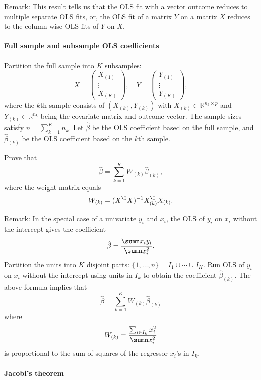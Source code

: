 Remark: 
This result tells us that the OLS fit with a vector outcome reduces to multiple separate OLS fits, or, the OLS fit of a matrix $Y$ on a matrix $X$ reduces to the column-wise OLS fits of $Y$ on $X$. 


\paragraph{Full sample and subsample OLS coefficients}\label{hw3::full-subsample-ols}

Partition the full sample into $K$ subsamples:
$$
X=\left(\begin{array}{c}
X_{(1)}\\
\vdots\\
X_{(K)}
\end{array}\right),\quad 
Y=\left(\begin{array}{c}
Y_{(1)}\\
\vdots\\
Y_{(K)}
\end{array}\right),
$$
where the $k$th sample consists of $(X_{(k)}, Y_{(k)})$ with $X_{(k)} \in \mathbb{R}^{n_k\times p}$ and $ Y_{(k)} \in \mathbb{R}^{n_k} $ being the covariate matrix and outcome vector. The sample sizes satisfy $n = \sum_{k=1}^K n_k$. Let $\hat{\beta}$ be the OLS coefficient based on the full sample, and $\hat{\beta}_{(k)}$ be the OLS coefficient based on the $k$th sample. 

Prove that 
$$
\hat{\beta} = \sum_{k=1}^{K}W_{(k)}\hat{\beta}_{(k)},
$$
where the weight matrix equals
$$
W_{(k)} =(X^{\T} X)^{-1} X_{(k)}^{\T}X_{(k)} .
$$


Remark: In the special case of a univariate $y_i$ and $x_i$, the OLS of $y_i$ on $x_i$ without the intercept gives the coefficient
$$
\hat\beta = \frac{ \sumn  x_i y_i }{  \sumn x_i^2 } . 
$$
Partition the units into $K$ disjoint parts: $\{ 1, \ldots, n \} = I_1 \cup \cdots \cup I_K$. Run OLS of $y_i$ on $x_i$ without the intercept using units in $I_k$ to obtain the coefficient $\hat{\beta}_{(k)}$. The above formula implies that
$$
\hat\beta =  \sum_{k=1}^K  W_{(k)} \hat{\beta}_{(k)}
$$
where
$$
W_{(k)}  = \frac{   \sum_{i \in I_k} x_i^2 }{ \sumn x_i^2 } 
$$
is proportional to the sum of squares of the regressor $x_i$'s in $I_k$.  
 

\paragraph{Jacobi's theorem}\label{hw03::jacobi}


